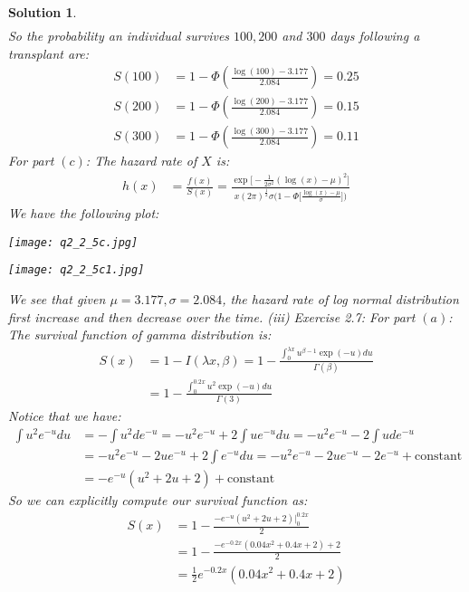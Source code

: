\documentclass[11pt]{article}
\newtheorem{sol}{Solution}
\begin{document}
\begin{sol}
\begin{align*}
	\end{align*}
	So the probability an individual survives $100, 200$ and $300$ days following a transplant are:
	\begin{align*}
		S(100) &= 1 -\Phi(\frac{\log(100) - 3.177}{2.084}) = 0.25 \\
		S(200) &= 1 - \Phi(\frac{\log(200) - 3.177}{2.084}) = 0.15\\
		S(300) &= 1 - \Phi(\frac{\log(300) - 3.177}{2.084}) = 0.11
	\end{align*}
	\hskip 2cm For part $(c)$:\vskip 2mm
	The hazard rate of $X$ is:
	\begin{align*}
		h(x) &= \frac{f(x)}{S(x)} = \frac{\exp\Big[-\frac{1}{2\sigma^2}(\log(x) - \mu)^2\Big]}{x(2\pi)^{\frac{1}{2}}\sigma\Big(1 - \Phi\Big[\frac{\log(x) - \mu}{\sigma}\Big]\Big)}
	\end{align*}
	We have the following plot:
	\begin{center}
		\texttt{[image: q2\_2\_5c.jpg]}
	\end{center}
	\begin{center}
		\texttt{[image: q2\_2\_5c1.jpg]}
	\end{center}
	We see that given $\mu = 3.177, \sigma = 2.084$, the hazard rate of log normal distribution first increase and then decrease over the time.\vskip 2mm
	(iii) Exercise 2.7:\vskip 2mm
	\hskip 2cm For part $(a)$:\vskip 2mm
	The survival function of gamma distribution is:
	\begin{align*}
		S(x) &= 1 - I(\lambda x, \beta) = 1 - \frac{ \int_0^{\lambda x}u^{\beta - 1}\exp(-u) d u}{\Gamma(\beta)}\\
		&=  1 - \frac{ \int_0^{0.2 x}u^2\exp(-u) d u}{\Gamma(3)}
	\end{align*}
	Notice that we have:
	\begin{align*}
		\int u^2e^{-u} du &= -\int u^2 d e^{-u} = -u^2 e^{-u}+ 2\int u e^{-u}du = -u^2 e^{-u} - 2\int u d e^{-u} \\
		&= -u^2e^{-u} - 2ue^{-u} + 2\int e^{-u}du = -u^2e^{-u} - 2ue^{-u} - 2e^{-u} + \text{constant}\\
		&= -e^{-u}(u^2 + 2u + 2) + \text{constant}
	\end{align*}
	So we can explicitly compute our survival function as:
	\begin{align*}
		S(x) &= 1 - \frac{-e^{-u}(u^2 + 2u + 2)\Big\vert_0^{0.2x}}{2}\\
		&= 1 - \frac{-e^{-0.2x}(0.04x^2 + 0.4x + 2) + 2}{2}\\
		&= \frac{1}{2}e^{-0.2x}(0.04x^2 + 0.4x + 2)

\end{align*}
\end{sol}
\end{document}
